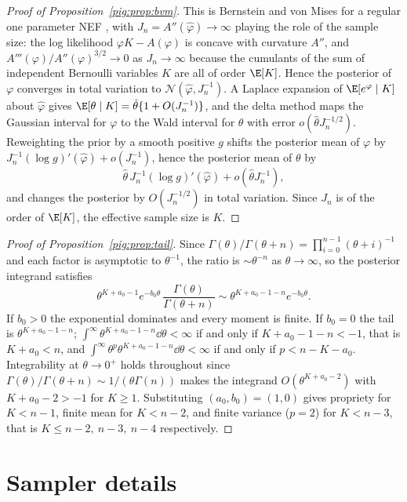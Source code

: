 \begin{proof}[Proof of Proposition~\ref{pig:prop:bvm}]
This is Bernstein and von Mises for a regular one parameter NEF \citep[Chapter 10]{pig:vandervaart1998}, with $J_n=A''(\hat\varphi)\to\infty$ playing the role of the sample size: the log likelihood $\varphi K-A(\varphi)$ is concave with curvature $A''$, and $A'''(\varphi)/A''(\varphi)^{3/2}\to0$ as $J_n\to\infty$ because the cumulants of the sum of independent Bernoulli variables $K$ are all of order $\E[K]$. Hence the posterior of $\varphi$ converges in total variation to $\mathcal{N}(\hat\varphi,J_n^{-1})$. A Laplace expansion of $\E[e^\varphi\mid K]$ about $\hat\varphi$ gives $\E[\theta\mid K]=\hat\theta\{1+O(J_n^{-1})\}$, and the delta method maps the Gaussian interval for $\varphi$ to the Wald interval for $\theta$ with error $o(\hat\theta J_n^{-1/2})$. Reweighting the prior by a smooth positive $g$ shifts the posterior mean of $\varphi$ by $J_n^{-1}(\log g)'(\hat\varphi)+o(J_n^{-1})$, hence the posterior mean of $\theta$ by
\[
\hat\theta\,J_n^{-1}(\log g)'(\hat\varphi)+o(\hat\theta J_n^{-1}),
\]
and changes the posterior by $O(J_n^{-1/2})$ in total variation. Since $J_n$ is of the order of $\E[K]$, the effective sample size is $K$.
\end{proof}

\begin{proof}[Proof of Proposition~\ref{pig:prop:tail}]
Since $\Gamma(\theta)/\Gamma(\theta+n)=\prod_{i=0}^{n-1}(\theta+i)^{-1}$ and each factor is asymptotic to $\theta^{-1}$, the ratio is $\sim\theta^{-n}$ as $\theta\to\infty$, so the posterior integrand satisfies
\[
\theta^{K+a_0-1}e^{-b_0\theta}\,\frac{\Gamma(\theta)}{\Gamma(\theta+n)}\sim\theta^{K+a_0-1-n}e^{-b_0\theta}.
\]
If $b_0>0$ the exponential dominates and every moment is finite. If $b_0=0$ the tail is $\theta^{K+a_0-1-n}$; $\int^\infty\theta^{K+a_0-1-n}\dd\theta<\infty$ if and only if $K+a_0-1-n<-1$, that is $K+a_0<n$, and $\int^\infty\theta^p\theta^{K+a_0-1-n}\dd\theta<\infty$ if and only if $p<n-K-a_0$. Integrability at $\theta\to0^+$ holds throughout since $\Gamma(\theta)/\Gamma(\theta+n)\sim1/(\theta\Gamma(n))$ makes the integrand $O(\theta^{K+a_0-2})$ with $K+a_0-2>-1$ for $K\ge1$. Substituting $(a_0,b_0)=(1,0)$ gives propriety for $K<n-1$, finite mean for $K<n-2$, and finite variance ($p=2$) for $K<n-3$, that is $K\le n-2,\ n-3,\ n-4$ respectively.
\end{proof}

\section{Sampler details}\label{pig:sec:sampler}


